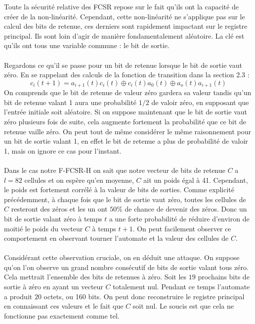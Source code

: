 \documentclass[11pt]{report}
\begin{document}
Toute la sécurité relative des FCSR repose sur le fait qu'ils ont la capacité de créer de la non-linéarité. Cependant, cette non-linéarité ne s'applique pas sur le calcul des bits de retenue, ces derniers sont rapidement impactant sur le registre principal. Ils sont loin d'agir de manière fondamentalement aléatoire. La clé est qu'ils ont tous une variable commune : le bit de sortie. 
\\
\\
Regardons ce qu'il se passe pour un bit de retenue lorsque le bit de sortie vaut zéro. En se rappelant des calculs de la fonction de transition dans la section 2.3 : 
$$
c_i(t+1) = a_{i+1}(t)c_i(t) \oplus c_i(t)a_0(t) \oplus a_o(t)a_{i+1}(t)
$$
On comprends que le bit de retenue de valeur zéro gardera sa valeur tandis qu'un bit de retenue valant 1 aura une probabilité $1/2$ de valoir zéro, en supposant que l'entrée initiale soit aléatoire. 
Si on suppose maintenant que le bit de sortie vaut zéro plusieurs fois de suite, cela augmente fortement la probabilité que ce bit de retenue vaille zéro. On peut tout de même considérer le même raisonnement pour un bit de sortie valant 1, en effet le bit de retenue a plus de probabilité de valoir 1, mais on ignore ce cas pour l'instant. 
\\
\\
Dans le cas notre F-FCSR-H on sait que notre vecteur de bits de retenue $C$ a $l= 82$ cellules et on espère qu'en moyenne, $C$ ait un poids égal à 41. Cependant, le poids est fortement corrélé à la valeur de bits de sorties. Comme explicité précédemment, à chaque fois que le bit de sortie vaut zéro, toutes les cellules de $C$ resteront des zéros et les un ont $50\%$ de chance de devenir des zéros. Donc un bit de sortie valant zéro à temps $t$ a une forte probabilité de réduire d'environ de moitié le poids du vecteur $C$ à temps $t+1$. On peut facilement observer ce comportement en observant tourner l'automate et la valeur des cellules de $C$. 
\\
\\
Considérant cette observation cruciale, on en déduit une attaque. On suppose qu'on l'on observe un grand nombre consécutif de bits de sortie valant tous zéro. Cela mettrait l'ensemble des bits de retenues à zéro. Soit les $19$ prochains bits de sortie à zéro en ayant un vecteur $C$ totalement nul. Pendant ce temps l'automate a produit $20$ octets, ou 160 bits. On peut donc reconstruire le registre principal en connaissant ces valeurs et le fait que $C$ soit nul. Le soucis est que cela ne fonctionne pas exactement comme tel. 
\end{document}
